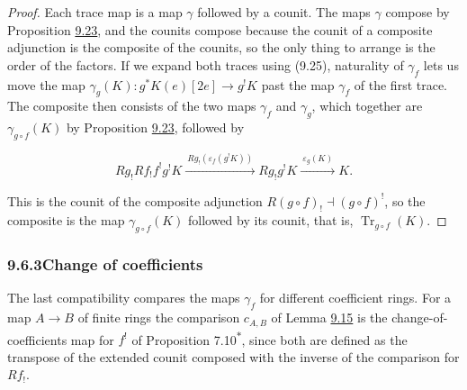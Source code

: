 \documentclass[11pt]{article}
\newcommand{\bpout}[1]{#1\textsuperscript{\hyperlink{bp-outside}{\ensuremath{\ast}}}}
\begin{document}
\begin{proof}[{Proof}]\label{bp87}%
Each trace map is a map \(\gamma\) followed by a counit. The maps \(\gamma\) compose by Proposition \hyperref[bp79]{9.23}, and the counits compose because the counit of a composite adjunction is the composite of the counits, so the only thing to arrange is the order of the factors. If we expand both traces using (9.25), naturality of \(\gamma_f\) lets us move the map \(\gamma_g(K):g^{*}K(e)[2e]\to g^!K\) past the map \(\gamma_f\) of the first trace. The composite then consists of the two maps \(\gamma_f\) and \(\gamma_g\), which together are \(\gamma_{g\circ f}(K)\) by Proposition \hyperref[bp79]{9.23}, followed by

\[
Rg_!Rf_!f^!g^!K
\xrightarrow{\ Rg_!(\varepsilon_{f}(g^!K))\ }
Rg_!g^!K
\xrightarrow{\ \varepsilon_{g}(K)\ }K.
\]

This is the counit of the composite adjunction \(R(g\circ f)_!\dashv(g\circ f)^!\), so the composite is the map \(\gamma_{g\circ f}(K)\) followed by its counit, that is, \(\operatorname{Tr}_{g\circ f}(K)\).
\end{proof}


\subsubsection*{\texorpdfstring{9.6.3\quad Change of coefficients}{9.6.3 Change of coefficients}}
\label{bp88}%
\label{bp89}%
The last compatibility compares the maps \(\gamma_f\) for different coefficient rings. For a map \(A\to B\) of finite rings the comparison \(c_{A,B}\) of Lemma \hyperref[bp47]{9.15} is the change-of-coefficients map for \(f^!\) of Proposition \bpout{7.10}, since both are defined as the transpose of the extended counit composed with the inverse of the comparison for \(Rf_!\).
\end{document}
